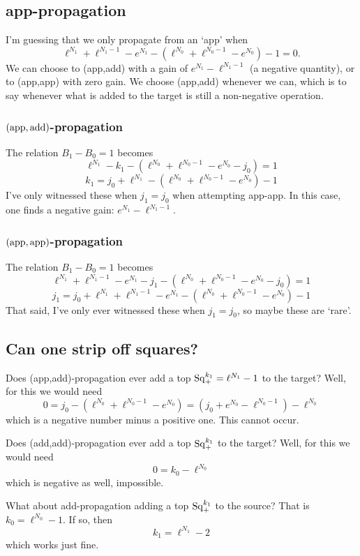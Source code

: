 \documentclass[10pt]{article}
\newcommand{\SqShift}{\Sq_{\smash{+}}}
\newcommand{\Sq}{\mathrm{Sq}}
\begin{document}
\begin{conjectured differentials}
\subsection{app-propagation}
I'm guessing that we only propagate from an `app' when
\[\ell^{N_1}+\ell^{N_1-1}-{e}^{N_1} -(\ell^{N_0}+\ell^{N_0-1}-{e}^{N_0})-1=0.\]
We can choose to (app,add) with a gain of $e^{N_1}-\ell^{N_1-1}$ (a negative quantity), or to (app,app) with zero gain. We choose (app,add) whenever we can, which is to say whenever what is added to the target is still a non-negative operation.

\subsubsection{$(\textup{app},\textup{add})$-propagation}
The relation $B_1-B_0=1$ becomes
\[\ell^{N_1}-k_1-(\ell^{N_0}+\ell^{N_0-1}-{e}^{N_0}-j_0)=1\]
\[k_1=j_0+\ell^{N_1}-(\ell^{N_0}+\ell^{N_0-1}-{e}^{N_0})-1\]
I've only witnessed these when $j_1=j_0$ when attempting app-app. In this case, one finds a negative gain: $e^{N_1}-\ell^{N_1-1}$.
\subsubsection{$(\textup{app},\textup{app})$-propagation}
The relation $B_1-B_0=1$ becomes
\[\ell^{N_1}+\ell^{N_1-1}-{e}^{N_1}-j_1-(\ell^{N_0}+\ell^{N_0-1}-{e}^{N_0}-j_0)=1\]
\[j_1=j_0+\ell^{N_1}+\ell^{N_1-1}-{e}^{N_1} -(\ell^{N_0}+\ell^{N_0-1}-{e}^{N_0})-1\]
That said, I've only ever witnessed these when $j_1=j_0$, so maybe these are `rare'.

\subsection{Can one strip off squares?}
Does (app,add)-propagation ever add a top $\SqShift^{k_1}=\ell^{N_1}-1$ to the target? Well, for this we would need
\[0=j_0-(\ell^{N_0}+\ell^{N_0-1}-{e}^{N_0}) =(j_0+e^{N_0}-\ell^{N_0-1})-\ell^{N_0}\]
which is a negative number minus a positive one. This cannot occur.

Does (add,add)-propagation ever add a top $\SqShift^{k_1}$ to the target? Well, for this we would need
\[0=k_0-\ell^{N_0}\]
which is negative as well, impossible.

What about add-propagation adding a top $\SqShift^{k_1}$ to the source? That is $k_0=\ell^{N_0}-1$. If so, then
\[k_1=\ell^{N_1}-2\]
which works just fine.


\end{conjectured differentials}
\end{document}
